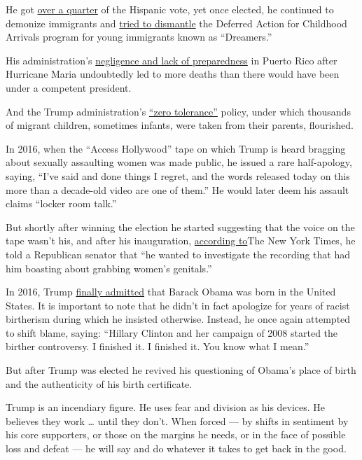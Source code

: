 He got \href{https://www.cnn.com/election/2016/results/exit-polls}{over
a quarter} of the Hispanic vote, yet once elected, he continued to
demonize immigrants and
\href{https://www.foxnews.com/politics/trump-says-he-will-sign-order-to-provide-road-to-citizenship-for-dreamers}{tried
to dismantle} the Deferred Action for Childhood Arrivals program for
young immigrants known as ``Dreamers.''

His administration's
\href{https://www.nytimes3xbfgragh.onion/2018/07/12/us/fema-puerto-rico-maria.html}{negligence
and lack of preparedness} in Puerto Rico after Hurricane Maria
undoubtedly led to more deaths than there would have been under a
competent president.

And the Trump administration's
\href{https://www.splcenter.org/news/2020/06/17/family-separation-under-trump-administration-timeline}{``zero
tolerance''} policy, under which thousands of migrant children,
sometimes infants, were taken from their parents, flourished.

In 2016, when the ``Access Hollywood'' tape on which Trump is heard
bragging about sexually assaulting women was made public, he issued a
rare half-apology, saying, ``I've said and done things I regret, and the
words released today on this more than a decade-old video are one of
them.'' He would later deem his assault claims ``locker room talk.''

But shortly after winning the election he started suggesting that the
voice on the tape wasn't his, and after his inauguration,
\href{https://www.nytimes3xbfgragh.onion/2017/11/28/us/politics/trump-access-hollywood-tape.html}{according
to}The New York Times, he told a Republican senator that ``he wanted to
investigate the recording that had him boasting about grabbing women's
genitals.''

In 2016, Trump
\href{https://www.youtube.com/watch?v=fjHPDzUOe2U}{finally admitted}
that Barack Obama was born in the United States. It is important to note
that he didn't in fact apologize for years of racist birtherism during
which he insisted otherwise. Instead, he once again attempted to shift
blame, saying: ``Hillary Clinton and her campaign of 2008 started the
birther controversy. I finished it. I finished it. You know what I
mean.''

But after Trump was elected he revived his questioning of Obama's place
of birth and the authenticity of his birth certificate.

Trump is an incendiary figure. He uses fear and division as his devices.
He believes they work \ldots{} until they don't. When forced --- by
shifts in sentiment by his core supporters, or those on the margins he
needs, or in the face of possible loss and defeat --- he will say and do
whatever it takes to get back in the good.

